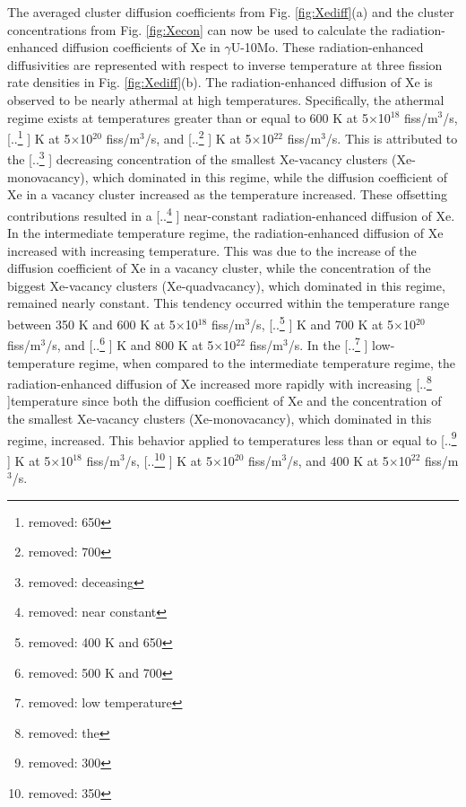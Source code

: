 \documentclass[preprint,12pt]{elsarticle}
\providecommand{\DIFadd}[1]{{\protect\color{blue} \sf #1}} %
\providecommand{\DIFdel}[1]{{\protect\color{red} [..\footnote{removed: #1} ]}} %
\providecommand{\DIFaddbegin}{} %
\providecommand{\DIFaddend}{} %
\providecommand{\DIFdelbegin}{} %
\providecommand{\DIFdelend}{} %
\newcommand{\DIFscaledelfig}{0.5}
\newlength{\DIFdelgraphicswidth} %
\newlength{\DIFdelgraphicsheight} %
\newcommand{\DIFaddincludegraphics}[2][]{{\color{blue}\fbox{\DIFOincludegraphics[#1]{#2}}}} %
\newcommand{\DIFdelincludegraphics}[2][]{%
\sbox{\DIFdelgraphicsbox}{\DIFOincludegraphics[#1]{#2}}%
\settoboxwidth{\DIFdelgraphicswidth}{\DIFdelgraphicsbox} %
\settoboxtotalheight{\DIFdelgraphicsheight}{\DIFdelgraphicsbox} %
\scalebox{\DIFscaledelfig}{%
\parbox[b]{\DIFdelgraphicswidth}{\usebox{\DIFdelgraphicsbox}\\[-\baselineskip] \rule{\DIFdelgraphicswidth}{0em}}\llap{\resizebox{\DIFdelgraphicswidth}{\DIFdelgraphicsheight}{%
\setlength{\unitlength}{\DIFdelgraphicswidth}%
\begin{picture}(1,1)%
\thicklines\linethickness{2pt} %
{\color[rgb]{1,0,0}\put(0,0){\framebox(1,1){}}}%
{\color[rgb]{1,0,0}\put(0,0){\line( 1,1){1}}}%
{\color[rgb]{1,0,0}\put(0,1){\line(1,-1){1}}}%
\end{picture}%
}\hspace*{3pt}}} %
} %
\DeclareRobustCommand{\DIFaddbegin}{\DIFOaddbegin \let\includegraphics\DIFaddincludegraphics} %
\DeclareRobustCommand{\DIFaddend}{\DIFOaddend \let\includegraphics\DIFOincludegraphics} %
\DeclareRobustCommand{\DIFdelbegin}{\DIFOdelbegin \let\includegraphics\DIFdelincludegraphics} %
\DeclareRobustCommand{\DIFdelend}{\DIFOaddend \let\includegraphics\DIFOincludegraphics} %
\begin{document}
\DIFaddend \indent The averaged cluster diffusion coefficients from Fig.  \ref{fig:Xediff}(a) and the cluster concentrations from Fig. \ref{fig:Xecon} can now be used to calculate the radiation-enhanced diffusion coefficients of Xe in $\gamma$U-10Mo. These radiation-enhanced diffusivities are represented with respect to inverse temperature at three fission rate densities in Fig. \ref{fig:Xediff}(b). The radiation-enhanced diffusion of Xe is observed to be nearly athermal at high temperatures. Specifically, the athermal regime exists at temperatures greater than or equal to 600 K at 5$\times$10$^{18}$ fiss/m$^{3}$/s, \DIFdelbegin \DIFdel{650 }\DIFdelend \DIFaddbegin \DIFadd{700 }\DIFaddend K at 5$\times$10$^{20}$ fiss/m$^{3}$/s, and \DIFdelbegin \DIFdel{700 }\DIFdelend \DIFaddbegin \DIFadd{800 }\DIFaddend K at 5$\times$10$^{22}$ fiss/m$^{3}$/s. This is attributed to the \DIFdelbegin \DIFdel{deceasing }\DIFdelend \DIFaddbegin \DIFadd{decreasing }\DIFaddend concentration of the smallest Xe-vacancy clusters (Xe-monovacancy), which dominated in this regime, while the diffusion coefficient of Xe in a vacancy cluster increased as the temperature increased. These offsetting contributions resulted in a \DIFdelbegin \DIFdel{near constant }\DIFdelend \DIFaddbegin \DIFadd{near-constant }\DIFaddend radiation-enhanced diffusion of Xe. In the intermediate temperature regime, the radiation-enhanced diffusion of Xe increased with increasing temperature. This was due to the increase of the diffusion coefficient of Xe in a vacancy cluster, while the concentration of the biggest Xe-vacancy clusters (Xe-quadvacancy), which dominated in this regime, remained nearly constant. This tendency  occurred within the temperature range between 350 K and 600 K at 5$\times$10$^{18}$ fiss/m$^{3}$/s, \DIFdelbegin \DIFdel{400 K and 650 }\DIFdelend \DIFaddbegin \DIFadd{375 K and 700 }\DIFaddend K at 5$\times$10$^{20}$ fiss/m$^{3}$/s, and \DIFdelbegin \DIFdel{500 K and 700 }\DIFdelend \DIFaddbegin \DIFadd{400 K and 800 }\DIFaddend K at 5$\times$10$^{22}$ fiss/m$^{3}$/s. In the \DIFdelbegin \DIFdel{low temperature }\DIFdelend \DIFaddbegin \DIFadd{low-temperature }\DIFaddend regime, when compared to the intermediate temperature regime, the radiation-enhanced diffusion of Xe increased more rapidly with increasing \DIFdelbegin \DIFdel{the }\DIFdelend temperature since both the diffusion coefficient of Xe and the concentration of the smallest Xe-vacancy clusters (Xe-monovacancy), which dominated in this regime, increased. This behavior applied to temperatures less than or equal to \DIFdelbegin \DIFdel{300 }\DIFdelend \DIFaddbegin \DIFadd{350 }\DIFaddend K at 5$\times$10$^{18}$ fiss/m$^{3}$/s, \DIFdelbegin \DIFdel{350 }\DIFdelend \DIFaddbegin \DIFadd{375 }\DIFaddend K at 5$\times$10$^{20}$ fiss/m$^{3}$/s, and 400 K at 5$\times$10$^{22}$ fiss/m$^{3}$/s.\\
\end{document}
